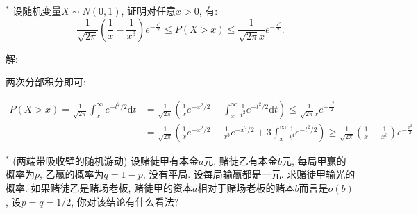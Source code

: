 \documentclass[standard]{ExBook}
\begin{document}
\begin{qitems}
\vspace{-5em}

    \begin{bbox}
    \begin{shaded}
        \qitem$^{*}$
设随机变量$X\sim N(0,1)$, 证明对任意$x > 0$, 有:
$$\frac{1}{\sqrt{2\pi}}\left(\frac{1}{x}-\frac{1}{x^3}\right)e^{-\frac{x^2}{2}} \leq P(X>x) \leq \frac{1}{\sqrt{2\pi}x}e^{-\frac{x^2}{2}}.$$
    \end{shaded}
    \end{bbox}

\vspace{-5em}

    \begin{bbox}
解: 

两次分部积分即可:
\vspace{-2em}
\begin{center}
\begin{equation}
    \begin{array}{cl}
        \nonumber
        P(X>x)=\displaystyle\frac{1}{\sqrt{2\pi}}\int_{x}^{\infty}e^{-t^2/2}\mathrm{d}t &=\displaystyle\frac{1}{\sqrt{2\pi}}\left(\displaystyle\frac{1}{x}e^{-x^2/2}-\int_{x}^{\infty}\frac{1}{t^2}e^{-t^2/2}\mathrm{d}t\right) \leq \frac{1}{\sqrt{2\pi}x}e^{-\frac{x^2}{2}}\\
         &=\displaystyle\frac{1}{\sqrt{2\pi}}\left(\displaystyle\frac{1}{x}e^{-x^2/2}-\frac{1}{x^3}e^{-x^2/2}+3\int_{x}^{\infty}\frac{1}{t^4}e^{-t^2/2}\right) \geq \frac{1}{\sqrt{2\pi}}\left(\frac{1}{x}-\frac{1}{x^3}\right)e^{-\frac{x^2}{2}}
    \end{array}
\end{equation}
\end{center}
    \end{bbox}

\vspace{-5em}

    \begin{bbox}
    \begin{shaded}
        \qitem$^{*}$
(两端带吸收壁的随机游动) 设赌徒甲有本金$a$元, 赌徒乙有本金$b$元, 每局甲赢的概率为$p$, 乙赢的概率为$q = 1 - p$, 没有平局. 设每局输赢都是一元. 求赌徒甲输光的概率. 如果赌徒乙是赌场老板, 赌徒甲的资本$a$相对于赌场老板的赌本$b$而言是$o(b)$, 设$p = q = 1/2$, 你对该结论有什么看法?


\end{shaded}
\end{bbox}
\end{qitems}
\end{document}
